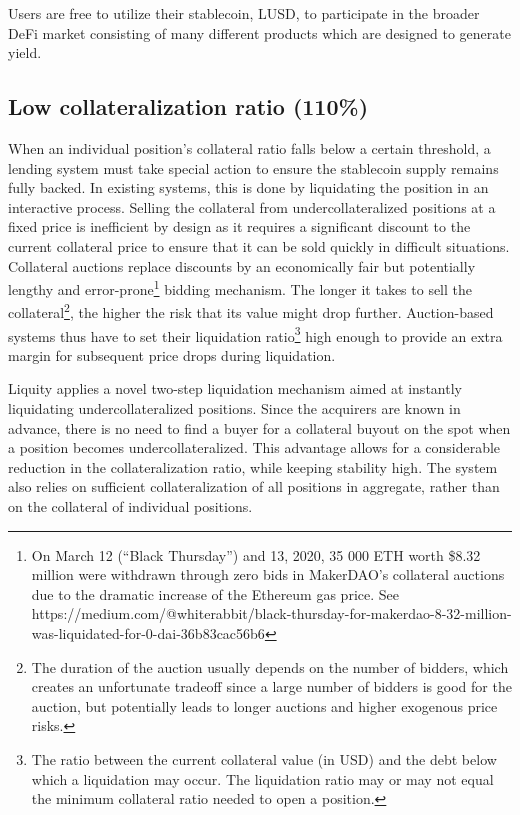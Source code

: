 \documentclass{article}
\begin{document}
Users are free to utilize their stablecoin, LUSD, to participate in the broader DeFi market consisting of many different products which are designed to generate yield.

\subsection{Low collateralization ratio (110\%)}
When an individual position’s collateral ratio falls below a certain threshold, a lending system must take special action to ensure the stablecoin supply remains fully backed. In existing systems, this is done by liquidating the position in an interactive process. Selling the collateral from undercollateralized positions at a fixed price is inefficient by design as it requires a significant discount to the current collateral price to ensure that it can be sold quickly in difficult situations. Collateral auctions replace discounts by an economically fair but potentially lengthy and error-prone\footnote{On March 12 (“Black Thursday”) and 13, 2020, 35 000 ETH worth \$8.32 million were withdrawn through zero bids in MakerDAO’s collateral auctions due to the dramatic increase of the Ethereum gas price. See https://medium.com/@whiterabbit/black-thursday-for-makerdao-8-32-million-was-liquidated-for-0-dai-36b83cac56b6} bidding mechanism. The longer it takes to sell the collateral\footnote{The duration of the auction usually depends on the number of bidders, which creates an unfortunate tradeoff since a large number of bidders is good for the auction, but potentially leads to longer auctions and higher exogenous price risks.}, the higher the risk that its value might drop further. Auction-based systems thus have to set their liquidation ratio\footnote{The ratio between the current collateral value (in USD) and the debt below which a liquidation may occur. The liquidation ratio may or may not equal the minimum collateral ratio needed to open a position.} high enough to provide an extra margin for subsequent price drops during liquidation.

Liquity applies a novel two-step liquidation mechanism aimed at instantly liquidating undercollateralized positions. Since the acquirers are known in advance, there is no need to find a buyer for a collateral buyout on the spot when a position becomes undercollateralized. This advantage allows for a considerable reduction in the collateralization ratio, while keeping stability high. The system also relies on sufficient collateralization of all positions in aggregate, rather than on the collateral of individual positions.
\end{document}

